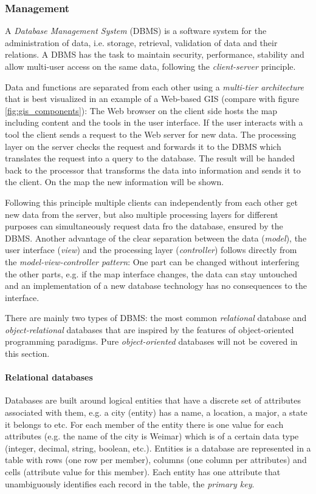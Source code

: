 

\subsubsection{Management} %
\label{ssub:management}

A \emph{Database Management System} (DBMS) is a software system for the administration of data, i.e. storage, retrieval, validation of data and their relations. A DBMS has the task to maintain security, performance, stability and allow multi-user access on the same data, following the \emph{client-server} principle.

Data and functions are separated from each other using a \emph{multi-tier architecture} that is best visualized in an example of a Web-based GIS (compare with figure \ref{fig:gis_components}): The Web browser on the client side hosts the map including content and the tools in the user interface. If the user interacts with a tool the client sends a request to the Web server for new data. The processing layer on the server checks the request and forwards it to the DBMS which translates the request into a query to the database. The result will be handed back to the processor that transforms the data into information and sends it to the client. On the map the new information will be shown.

Following this principle multiple clients can independently from each other get new data from the server, but also multiple processing layers for different purposes can simultaneously request data fro the database, ensured by the DBMS. Another advantage of the clear separation between the data (\emph{model}), the user interface (\emph{view}) and the processing layer (\emph{controller}) follows directly from the \emph{model-view-controller pattern}: One part can be changed without interfering the other parts, e.g. if the map interface changes, the data can stay untouched and an implementation of a new database technology has no consequences to the interface.

There are mainly two types of DBMS: the most common \emph{relational} database and \emph{object-relational} databases that are inspired by the features of object-oriented programming paradigms. Pure \emph{object-oriented} databases will not be covered in this section.

\paragraph{Relational databases} %
\label{par:relational_databases}
Databases are built around logical entities that have a discrete set of attributes associated with them, e.g. a city (entity) has a name, a location, a major, a state it belongs to etc. For each member of the entity there is one value for each attributes (e.g. the name of the city is Weimar) which is of a certain data type (integer, decimal, string, boolean, etc.). Entities is a database are represented in a table with rows (one row per member), columns (one column per attributes) and cells (attribute value for this member). Each entity has one attribute that unambiguously identifies each record in the table, the \emph{primary key}.

